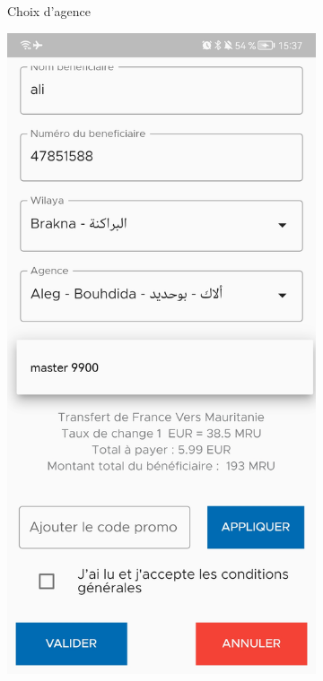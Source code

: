 \begin{itemize}[label=$\ast$]
\begin{figure}
\begin{subfigure}[b]{0.3\textwidth}
		\caption{Choix d'agence}
		\label{fig:y equals x}
	\end{subfigure}
	\hfill
	\begin{subfigure}[b]{0.3\textwidth}
		\centering
		\includegraphics[width=\textwidth]{./Template LaTeX/Images/14.jpg}

\end{subfigure}
\end{figure}
\end{itemize}
